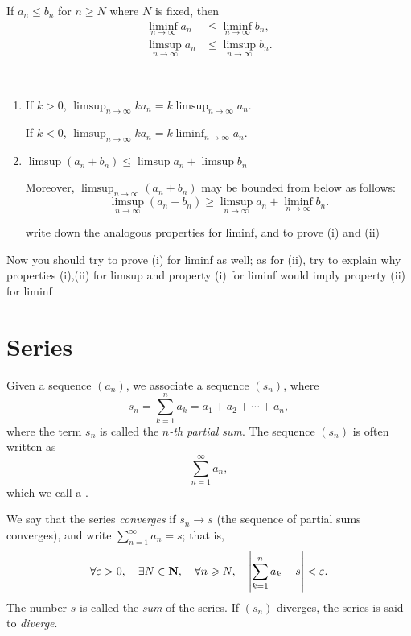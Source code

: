 \begin{proposition}\label{prop:limsup-liminf-comp}
If $a_n\le b_n$ for $n\ge N$ where $N$ is fixed, then
\begin{align*}
\liminf_{n\to\infty}a_n&\le\liminf_{n\to\infty}b_n,\\
\limsup_{n\to\infty}a_n&\le\limsup_{n\to\infty}b_n.
\end{align*}
\end{proposition}

\begin{proposition} \
\begin{enumerate}[label=(\roman*)]
\item If $k>0$, $\displaystyle\limsup_{n\to\infty}ka_n=k\limsup_{n\to\infty}a_n$.

If $k<0$, $\displaystyle\limsup_{n\to\infty}ka_n=k\liminf_{n\to\infty}a_n$.

\item $\displaystyle\limsup(a_n+b_n)\le\limsup a_n+\limsup b_n$

Moreover, $\displaystyle\limsup_{n\to\infty}(a_n+b_n)$ may be bounded from below as follows:
\[ \limsup_{n\to\infty}(a_n+b_n)\ge\limsup_{n\to\infty}a_n+\liminf_{n\to\infty}b_n.\]

write down the analogous properties for liminf, and to prove (i) and (ii)
\end{enumerate}
\end{proposition}

Now you should try to prove (i) for liminf as well; as for (ii), try to explain why properties (i),(ii) for limsup and property (i) for liminf would imply property (ii) for liminf
\pagebreak

\section{Series}
\begin{definition}[Series]
Given a sequence $(a_n)$, we associate a sequence $(s_n)$, where
\[s_n=\sum_{k=1}^n a_k=a_1+a_2+\cdots+a_n,\]
where the term $s_n$ is called the \emph{$n$-th partial sum}. The sequence $(s_n)$ is often written as
\[\sum_{n=1}^{\infty}a_n,\]
which we call a .
\end{definition}

\begin{definition}
We say that the series \emph{converges} if $s_n\to s$ (the sequence of partial sums converges), and write $\displaystyle\sum_{n=1}^\infty a_n=s$; that is,
\[\forall\varepsilon>0,\quad\exists N\in\mathbf N,\quad\forall n\geqslant N,\quad\left|\sum_{k=1}^n a_k-s\right|<\varepsilon.\]
The number $s$ is called the \emph{sum} of the series. If $(s_n)$ diverges, the series is said to \emph{diverge}.
\end{definition}

